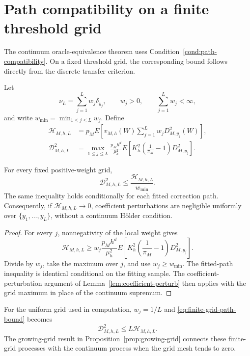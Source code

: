 \section{Path compatibility on a finite threshold grid}
\label{sec:supp-grid-path-compatibility}

The continuum oracle-equivalence theorem uses Condition~\ref{cond:path-compatibility}. On a fixed threshold grid, the corresponding bound follows directly from the discrete transfer criterion.

Let
\[
\nu_L=\sum_{j=1}^Lw_j\delta_{y_j},
\qquad
w_j>0,
\qquad
\sum_{j=1}^Lw_j<\infty,
\]
and write \(w_{\min}=\min_{1\le j\le L}w_j\). Define
\begin{align*}
\mathcal H_{M,h,L}
&=
p_ME\left[
v_{M,h}(W)
\sum_{j=1}^Lw_jD_{M,y_j}^2(W)
\right],\\
\mathcal D_{M,h,L}^2
&=
\max_{1\le j\le L}
\frac{p_Mh^d}{\mu_h^2}
E\left[
K_h^2
\left(\frac1{\pi_M}-1\right)
D_{M,y_j}^2
\right].
\end{align*}

\begin{lemma}
\label{lem:finite-grid-path-compatibility}
For every fixed positive-weight grid,
\begin{equation}
\mathcal D_{M,h,L}^2
\le
\frac{\mathcal H_{M,h,L}}{w_{\min}}.
\label{eq:finite-grid-path-bound}
\end{equation}
The same inequality holds conditionally for each fitted correction path. Consequently, if \(\mathcal H_{M,h,L}\to0\), coefficient perturbations are negligible uniformly over \(\{y_1,\ldots,y_L\}\), without a continuum H\"older condition.
\end{lemma}

\begin{proof}
For every \(j\), nonnegativity of the local weight gives
\[
\mathcal H_{M,h,L}
\ge
w_j
\frac{p_Mh^d}{\mu_h^2}
E\left[
K_h^2
\left(\frac1{\pi_M}-1\right)
D_{M,y_j}^2
\right].
\]
Divide by \(w_j\), take the maximum over \(j\), and use \(w_j\ge w_{\min}\). The fitted-path inequality is identical conditional on the fitting sample. The coefficient-perturbation argument of Lemma~\ref{lem:coefficient-perturb} then applies with the grid maximum in place of the continuum supremum.
\end{proof}

For the uniform grid used in computation, \(w_j=1/L\) and \eqref{eq:finite-grid-path-bound} becomes
\[
\mathcal D_{M,h,L}^2
\le L\mathcal H_{M,h,L}.
\]
The growing-grid result in Proposition~\ref{prop:growing-grid} connects these finite-grid processes with the continuum process when the grid mesh tends to zero.
